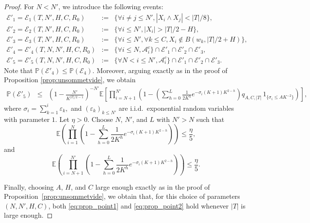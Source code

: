 \documentclass[french]{article}
\newcommand{\E}{\mathbb{E}}
\renewcommand{\P}{\mathbb{P}}
\newcommand{\Tf}{T}
\renewcommand{\1}{\mathds{1}}
\begin{document}
\begin{proof}
For $N<N'$, we introduce the following events:
    \begin{eqnarray*}
\mathcal{E}'_1=\mathcal{E}_1(\Tf,N',H,C,R_0) &:=& \{\forall i\neq j \le N', |X_i\wedge X_j|< |\Tf|/8\},\\
\mathcal{E}'_2=\mathcal{E}_2(\Tf,N',H,C,R_0) &:=& \{\forall i \le N', |X_i|> |\Tf|/2-H\},\\
\mathcal{E}'_3=\mathcal{E}_3(\Tf,N',H,C,R_0) &:=& \{\forall i \le N', \forall k \le C, X_i\notin B(w_k,|\Tf|/2+H)\},\\
\mathcal{E}'_4=\mathcal{E}'_4(\Tf,N,N',H,C,R_0) &:=&\{\forall i \le N, \mathcal{A}_i^c\}\cap  {\mathcal{E}'_1} \cap  {\mathcal{E}'_2} \cap  {\mathcal{E}'_3},\\
\mathcal{E}'_5=\mathcal{E}'_5(\Tf,N,N',H,C,R_0) &:=&\{\forall N<i \le N', \mathcal{A}_i^c\}\cap  {\mathcal{E}'_1} \cap  {\mathcal{E}'_2} \cap  {\mathcal{E}'_3}.
\end{eqnarray*}
Note that $\P(\mathcal{E}'_4)\le \P(\mathcal{E}_4)$. Moreover, arguing exactly as in the proof of Proposition \ref{prop:unsommetvide}, we obtain
\begin{eqnarray*}
\P(\mathcal{E}'_5)
&\le&
\left(1-\frac{N'}{K^{|\Tf|/2-1}}\right)^{-N'}
\E\left[
\prod_{i=N+1}^{N'}
\left(
1-
\left(
\sum_{h=0}^{L}\frac{1}{2K^h}
e^{-\sigma_i(K+1)K^{2-h}}
\right)
q_{A,C,|\Tf|}
\,1_{\{\sigma_i\le A K^{-2}\}}
\right)
\right],
\end{eqnarray*}
where
$
\sigma_i=\sum_{k=1}^{i}\varepsilon_k,
$
and $(\varepsilon_k)_{k\le N'}$ are i.i.d.\ exponential random variables with parameter $1$.
Let $\eta>0$. Choose $N$, $N'$, and $L$ with $N'>N$ such that
\begin{equation*}
\E\left(
\prod_{i=1}^{N}
\left(
1-\sum_{h=0}^{L}\frac{1}{2K^h}
e^{-\sigma_i(K+1)K^{2-h}}
\right)
\right)
\le \frac{\eta}{5},
\end{equation*}
and
\begin{equation*}
\E\left(
\prod_{i=N+1}^{N'}
\left(
1-\sum_{h=0}^{L}\frac{1}{2K^h}
e^{-\sigma_i(K+1)K^{2-h}}
\right)
\right)
\le \frac{\eta}{5}.
\end{equation*}

Finally, choosing $A$, $H$, and $C$ large enough exactly as in the proof of Proposition~\ref{prop:unsommetvide}, we obtain that, for this choice of parameters $(N,N',H,C)$, both \eqref{eq:prop_point1} and \eqref{eq:prop_point2} hold whenever $|\Tf|$ is large enough.



\end{proof}
\end{document}
